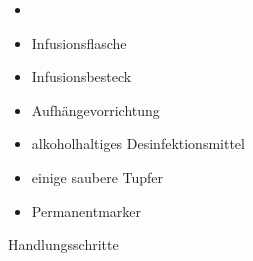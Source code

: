 \documentclass{article}
\begin{document}
\begin{itemize}
\item \item {\mdseries
Infusionsflasche}

\item {\mdseries
Infusionsbesteck}

\item {\mdseries
Aufh\"angevorrichtung}

\item {\mdseries
alkoholhaltiges Desinfektionsmittel}

\item {\mdseries
einige saubere Tupfer}

\item {\mdseries
Permanentmarker}

\end{itemize}
{\mdseries\color{black}
Handlungsschritte}
\end{document}
